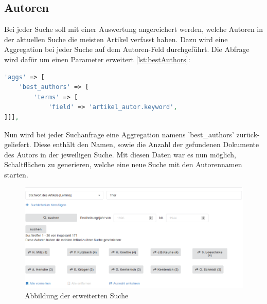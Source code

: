 \subsection{Autoren}

Bei jeder Suche soll mit einer Auswertung angereichert werden, welche Autoren in der aktuellen Suche die meisten Artikel verfasst haben. Dazu wird eine Aggregation bei jeder Suche auf dem Autoren-Feld durchgeführt. Die Abfrage wird dafür um einen Parameter erweitert \ref{lst:bestAuthors}:

\begin{lstlisting}[language=PHP, frame=single, label={lst:bestAuthors}, caption=Auschnitt aus der Abfrage zur Aggregation der Autoren,captionpos=b] 
'aggs' => [
    'best_authors' => [
        'terms' => [
            'field' => 'artikel_autor.keyword',
]]],
\end{lstlisting}


Nun wird bei jeder Suchanfrage eine Aggregation namens 'best\_authors' zurück-geliefert. Diese enthält den Namen, sowie die Anzahl der gefundenen Dokumente des Autors in der jeweiligen Suche. 
Mit diesen Daten war es nun möglich, Schaltflächen zu generieren, welche eine neue Suche mit den Autorennamen starten.


\begin{figure}
	\centering
	\includegraphics[width=1\linewidth]{images/best_authors.png}
	\caption{Abbildung der erweiterten Suche}
	\label{img:erweiterteSuche}
\end{figure}
